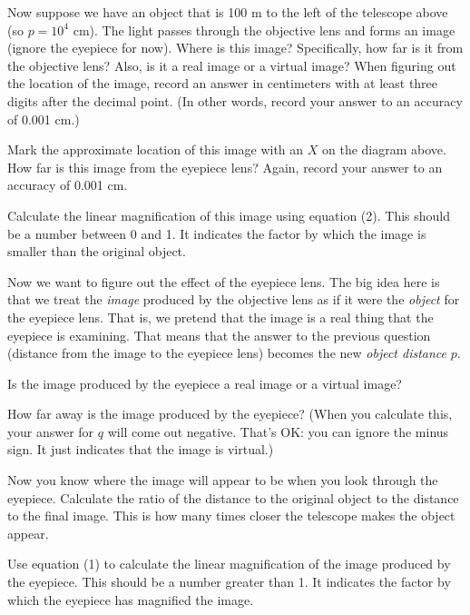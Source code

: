\vskip 2in

Now suppose we have an object that is 100 m to the left of the telescope
above (so $p= 10^4$ cm).  The light passes through the objective lens
and forms an image (ignore the eyepiece for now).  Where is this
image?  Specifically, how far is it from the objective lens?  Also,
is it a real image or a virtual image?  When figuring out the
location of the image, record an answer in centimeters with at least
three digits after the decimal point.  (In other words, record
your answer to an accuracy of 0.001 cm.)

\vskip 1in

Mark the approximate location of this image with an $X$ on the diagram
above.
How far is this image from the eyepiece lens?  Again, record your answer
to an accuracy of 0.001 cm.

\vskip 1in

Calculate the linear magnification of this image using equation (2).
This should be a number between 0 and 1.  It indicates the factor
by which the image is smaller than the original object.

\vskip 1in


Now we want to figure out the effect of the eyepiece lens.  The big
idea here is that we treat the {\it image} produced by the objective
lens as if it were the {\it object} for the eyepiece lens.  That is,
we pretend that the image is a real thing that the eyepiece is examining.
That means that the answer to the previous question (distance
from the image to the eyepiece lens) becomes the new {\it object distance}
$p$.

Is the image produced by the eyepiece a real image or a virtual image?

\vskip 1in

How far away is the image produced by the eyepiece?
(When you calculate this, your answer for $q$ will come out negative.
That's OK: you can ignore the minus sign.  It just indicates that
the image is virtual.)

\vskip 1in

Now you know where the image will appear to be when you look through
the eyepiece.  Calculate the ratio of the distance to the original
object to the distance to the final image.  This is how many
times closer the telescope makes the object appear.

\vskip 1in

Use equation (1) to calculate the linear magnification of the image produced by 
the eyepiece.  This should be a number greater than 1.  It indicates
the factor by which the eyepiece has magnified the image.

